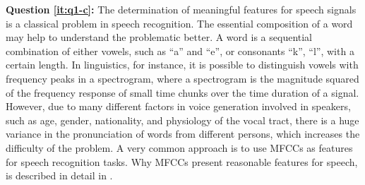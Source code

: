 \textbf{Question \ref{it:q1-c}:} 
The determination of meaningful features for speech signals is a classical problem in speech recognition.
The essential composition of a word may help to understand the problematic better.
A word is a sequential combination of either vowels, such as \enquote{a} and \enquote{e}, or consonants \enquote{k}, \enquote{l}, with a certain length. 
In linguistics, for instance, it is possible to distinguish vowels with frequency peaks in a spectrogram, where a spectrogram is the magnitude squared of the frequency response of small time chunks over the time duration of a signal.
However, due to many different factors in voice generation involved in speakers, such as age, gender, nationality, and physiology of the vocal tract, there is a huge variance in the pronunciation of words from different persons, which increases the difficulty of the problem.
A very common approach is to use MFCCs as features for speech recognition tasks.
Why MFCCs present reasonable features for speech, is described in detail in .



